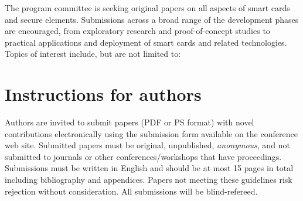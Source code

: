 \documentclass[letter]{article}
\begin{document}
\begin{tabularx}{\linewidth}
  The program committee is seeking original papers on all aspects of
  smart cards and secure elements. Submissions across a broad range of
  the development phases are encouraged, from exploratory research and
  proof-of-concept studies to practical applications and deployment of
  smart cards and related technologies. Topics of interest include,
  but are not limited to:\par{}


  \section*{Instructions for authors}

  Authors are invited to submit papers (PDF or PS format) with novel
  contributions electronically using the submission form available on
  the conference web site.
  Submitted papers must be original, unpublished, \emph{anonymous},
  and not submitted to journals or other conferences/workshops that
  have proceedings. Submissions must be written in English and should
  be at most 15 pages in total including bibliography and
  appendices. Papers not meeting these guidelines risk rejection
  without consideration. All submissions will be
  blind-refereed.\par\smallskip


\end{tabularx}
\end{document}
